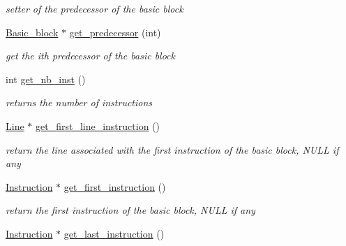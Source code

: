 \begin{DoxyCompactItemize}
\begin{DoxyCompactList}\small\item\em setter of the predecessor of the basic block \end{DoxyCompactList}\item 
\hypertarget{class_basic__block_a5381da0d3cfdae07df433ffac3e8ebae}{\hyperlink{class_basic__block}{Basic\+\_\+block} $\ast$ \hyperlink{class_basic__block_a5381da0d3cfdae07df433ffac3e8ebae}{get\+\_\+predecessor} (int)}\label{class_basic__block_a5381da0d3cfdae07df433ffac3e8ebae}

\begin{DoxyCompactList}\small\item\em get the ith predecessor of the basic block \end{DoxyCompactList}\item 
\hypertarget{class_basic__block_ad3d770c77ba92d455fa3430df5f16eff}{int \hyperlink{class_basic__block_ad3d770c77ba92d455fa3430df5f16eff}{get\+\_\+nb\+\_\+inst} ()}\label{class_basic__block_ad3d770c77ba92d455fa3430df5f16eff}

\begin{DoxyCompactList}\small\item\em returns the number of instructions \end{DoxyCompactList}\item 
\hypertarget{class_basic__block_a713786fa5bb012d4850dffb8f7771542}{\hyperlink{class_line}{Line} $\ast$ \hyperlink{class_basic__block_a713786fa5bb012d4850dffb8f7771542}{get\+\_\+first\+\_\+line\+\_\+instruction} ()}\label{class_basic__block_a713786fa5bb012d4850dffb8f7771542}

\begin{DoxyCompactList}\small\item\em return the line associated with the first instruction of the basic block, N\+U\+L\+L if any \end{DoxyCompactList}\item 
\hypertarget{class_basic__block_ae6bb481bd9c6352a9f3d7bc5bb2680ac}{\hyperlink{class_instruction}{Instruction} $\ast$ \hyperlink{class_basic__block_ae6bb481bd9c6352a9f3d7bc5bb2680ac}{get\+\_\+first\+\_\+instruction} ()}\label{class_basic__block_ae6bb481bd9c6352a9f3d7bc5bb2680ac}

\begin{DoxyCompactList}\small\item\em return the first instruction of the basic block, N\+U\+L\+L if any \end{DoxyCompactList}\item 
\hypertarget{class_basic__block_a7083c8485a2378cdfae477a8466eb348}{\hyperlink{class_instruction}{Instruction} $\ast$ \hyperlink{class_basic__block_a7083c8485a2378cdfae477a8466eb348}{get\+\_\+last\+\_\+instruction} ()}\label{class_basic__block_a7083c8485a2378cdfae477a8466eb348}


\end{DoxyCompactItemize}
